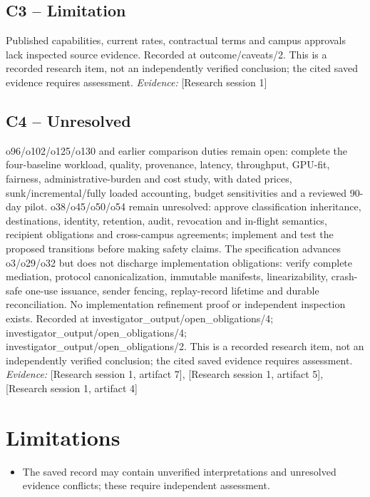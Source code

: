 \documentclass[11pt]{article}
\begin{document}
\subsection{C3 -- Limitation}
Published capabilities, current rates, contractual terms and campus approvals lack inspected source evidence.
Recorded at outcome/caveats/2. This is a recorded research item, not an independently verified conclusion; the cited saved evidence requires assessment.
\textit{Evidence: }[Research session 1]
\subsection{C4 -- Unresolved}
o96/o102/o125/o130 and earlier comparison duties remain open: complete the four-baseline workload, quality, provenance, latency, throughput, GPU-fit, fairness, administrative-burden and cost study, with dated prices, sunk/incremental/fully loaded accounting, budget sensitivities and a reviewed 90-day pilot. o38/o45/o50/o54 remain unresolved: approve classification inheritance, destinations, identity, retention, audit, revocation and in-flight semantics, recipient obligations and cross-campus agreements; implement and test the proposed transitions before making safety claims. The specification advances o3/o29/o32 but does not discharge implementation obligations: verify complete mediation, protocol canonicalization, immutable manifests, linearizability, crash-safe one-use issuance, sender fencing, replay-record lifetime and durable reconciliation. No implementation refinement proof or independent inspection exists.
Recorded at investigator\_output/open\_obligations/4; investigator\_output/open\_obligations/4; investigator\_output/open\_obligations/2. This is a recorded research item, not an independently verified conclusion; the cited saved evidence requires assessment.
\textit{Evidence: }[Research session 1, artifact 7], [Research session 1, artifact 5], [Research session 1, artifact 4]
\section{Limitations}
\begin{itemize}
\item The saved record may contain unverified interpretations and unresolved evidence conflicts; these require independent assessment.
\end{itemize}
\end{document}
